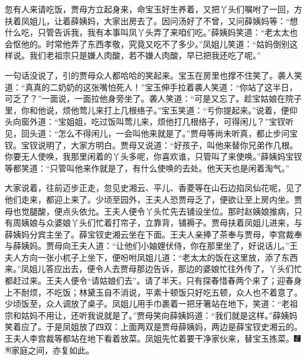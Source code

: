 忽有人来请吃饭，贾母方立起身来，命宝玉好生养着，又把丫头们嘱咐了一回，方扶着凤姐儿，让着薛姨妈，大家出房去了。因问汤好了不曾，又问薛姨妈等：“想什么吃，只管告诉我，我有本事叫凤丫头弄了来咱们吃。”薛姨妈笑道：“老太太也会怄他的。时常他弄了东西孝敬，究竟又吃不了多少。”凤姐儿笑道：“姑妈倒别这样说。我们老祖宗只是嫌人肉酸，若不嫌人肉酸，早已把我还吃了呢。”

一句话没说了，引的贾母众人都哈哈的笑起来。宝玉在房里也撑不住笑了。袭人笑道：“真真的二奶奶的这张嘴怕死人！”宝玉伸手拉着袭人笑道：“你站了这半日，可乏了？”一面说，一面拉他身旁坐了。袭人笑道：“可是又忘了。趁宝姑娘在院子里，你和他说，烦他莺儿来打上几根络子。”宝玉笑道：“亏你提起来。”说着，便仰头向窗外道：“宝姐姐，吃过饭叫莺儿来，烦他打几根络子，可得闲儿？”宝钗听见，回头道：“怎么不得闲儿，一会叫他来就是了。”贾母等尚未听真，都止步问宝钗。宝钗说明了，大家方明白。贾母又说道：“好孩子，叫他来替你兄弟作几根。你要无人使唤，我那里闲着的丫头多呢，你喜欢谁，只管叫了来使唤。”薛姨妈宝钗等都笑道：“只管叫他来作就是了，有什么使唤的去处。他天天也是闲着淘气。”

大家说着，往前迈步正走，忽见史湘云、平儿、香菱等在山石边掐凤仙花呢，见了他们走来，都迎上来了。少顷至园外，王夫人恐贾母乏了，便欲让至上房内坐。贾母也觉腿酸，便点头依允。王夫人便令丫头忙先去铺设坐位。那时赵姨娘推病，只有周姨娘与众婆娘丫头们忙着打帘子，立靠背，铺褥子。贾母扶着凤姐儿进来，与薛姨妈分宾主坐了。薛宝钗史湘云坐在下面。王夫人亲捧了茶奉与贾母，李宫裁奉与薛姨妈。贾母向王夫人道：“让他们小妯娌伏侍，你在那里坐了，好说话儿。”王夫人方向一张小杌子上坐下，便吩咐凤姐儿道：“老太太的饭在这里放，添了东西来。”凤姐儿答应出去，便令人去贾母那边告诉，那边的婆娘忙往外传了，丫头们忙都赶过来。王夫人便令“请姑娘们去”。请了半天，只有探春惜春两个来了；迎春身上不耐烦，不吃饭；林黛玉自不消说，平素十顿饭只好吃五顿，众人也不着意了。少顷饭至，众人调放了桌子。凤姐儿用手巾裹着一把牙箸站在地下，笑道：“老祖宗和姑妈不用让，还听我说就是了。”贾母笑向薛姨妈道：“我们就是这样。”薛姨妈笑着应了。于是凤姐放了四双：上面两双是贾母薛姨妈，两边是薛宝钗史湘云的。王夫人李宫裁等都站在地下看着放菜。凤姐先忙着要干净家伙来，替宝玉拣菜。{\includegraphics[width=3mm]{../Images/00006}\includegraphics[width=3mm]{../Images/00011}\footnotesize \kaishu 家庭之间，亦复如此。}

